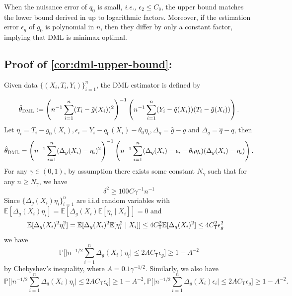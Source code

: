 \documentclass{article}
\def\eps{{\epsilon}}
\newcommand{\E}{\mathbb{E}}
\newcommand{\ncref}[1]{\cref{#1}: \nameref*{#1}} %
\newcommand{\pcref}[1]{Proof of \ncref{#1}} %
\newcommand{\dml}{\textsc{DML}}
\begin{document}
When the nuisance error of $q_0$ is small, \emph{i.e.,} $\eps_2 \leq C_\uptheta$, the upper bound matches the lower bound derived in  up to logarithmic factors. Moreover, if the estimation error $\eps_g$ of $g_0$ is polynomial in $n$, then they differ by only a constant factor, implying that DML is minimax optimal.

\subsection{\pcref{cor:dml-upper-bound}}
\label{subsec:proof-dml-upper-bound}

Given data $\{(X_i,T_i,Y_i)\}_{i=1}^n$, the DML estimator is defined by

\begin{equation}
    \notag
    \hat{\theta}_{\dml} := \left(n^{-1}\sum_{i=1}^n (T_i-\hat{g}(X_i))^2\right)^{-1}\left(n^{-1}\sum_{i=1}^n (Y_i-\hat{q}(X_i))(T_i-\hat{g}(X_i))\right).
\end{equation}
Let $\eta_i=T_i-g_0(X_i), \eps_i=Y_i-q_0(X_i)-\theta_0\eta_i, \Delta_g=\hat{g}-g$ and $\Delta_q=\hat{q}-q$, then
\begin{equation}
    \notag
    \hat{\theta}_{\dml} = \left(n^{-1}\sum_{i=1}^n (\Delta_g(X_i)-\eta_i)^2\right)^{-1}\left(n^{-1}\sum_{i=1}^n (\Delta_q(X_i)-\eps_i-\theta_0\eta_i) (\Delta_g(X_i)-\eta_i)\right).
\end{equation}
For any $\gamma\in(0,1)$, by assumption there exists some constant $N_{\gamma}$ such that for any $n\geq N_{\gamma}$, we have
\begin{equation}
    \label{eq:large-sample}
    \delta^2 \geq 100C\gamma^{-1}n^{-1}
\end{equation}
Since $\{\Delta_g(X_i)\eta_i\}_{i=1}^n$ are i.i.d  random variables with $\E[\Delta_g(X_i)\eta_i]=\E[\Delta_g(X_i)\E[\eta_i\mid X_i]]=0$ and
\begin{equation}
    \notag
    \begin{aligned}
        \E[\Delta_g(X_i)^2\eta_i^2] &= \E[\Delta_g(X_i)^2\E[\eta_i^2\mid X_i]] \leq 4C_{\mathsf{T}}^2 \E[\Delta_g(X_i)^2] \leq 4C_{\mathsf{T}}^2\eps_g^2 
    \end{aligned}
\end{equation}
we have $$\mathbb{P}\bigg[\big|n^{-1/2}\sum_{i=1}^n \Delta_g(X_i)\eta_i\big|\leq 2AC_{\mathsf{T}}\eps_g\bigg] \geq 1- A^{-2}$$
by Chebyshev's inequality, where $A = 0.1\gamma^{-1/2}$.
Similarly, we also have $$\mathbb{P}\bigg[\big|n^{-1/2}\sum_{i=1}^n \Delta_q(X_i)\eta_i\big|\leq 2AC_{\mathsf{T}}\eps_q\bigg] \geq 1- A^{-2}, \mathbb{P}\bigg[\big|n^{-1/2}\sum_{i=1}^n \Delta_g(X_i)\eps_i\big|\leq 2AC_{\mathsf{T}}\eps_g\bigg] \geq 1- A^{-2}.$$
\end{document}
